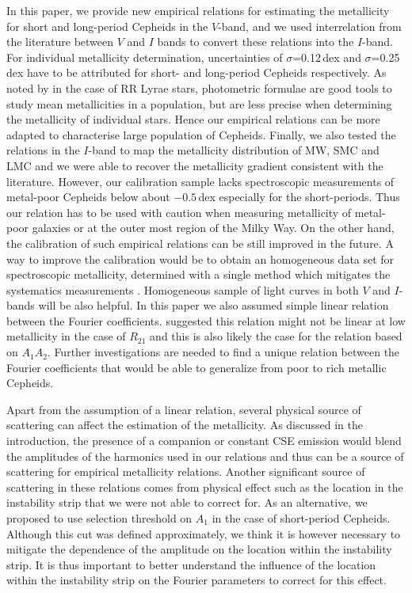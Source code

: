 \documentclass[article]{aa} %
\begin{document}
In this paper, we provide new empirical relations for estimating the metallicity for short and long-period Cepheids in the $V$-band, and we used interrelation from the literature between $V$ and $I$ bands to convert these relations into the $I$-band.
 For individual metallicity determination, uncertainties of $\sigma$=0.12$\,$dex and $\sigma$=0.25$\,$dex have to be attributed for short- and long-period Cepheids respectively. As noted by \cite{Cacciari2005} in the case of RR Lyrae stars, photometric formulae are good tools to study mean metallicities in a population, but are less precise when determining the metallicity of individual stars. Hence our empirical relations can be more adapted to characterise large population of Cepheids. Finally, we also tested the relations in the $I$-band to map the metallicity distribution of MW, SMC and LMC and we were able to recover the metallicity gradient consistent with the literature. However, our calibration sample lacks spectroscopic measurements of metal-poor Cepheids below about $-0.5\,$dex especially for the short-periods. Thus our relation has to be used with caution when measuring metallicity of metal-poor galaxies or at the outer most region of the Milky Way. On the other hand, the calibration of such empirical relations can be still improved in the future. A way to improve the calibration would be to obtain an homogeneous data set for spectroscopic metallicity, determined with a single method which mitigates the systematics measurements \citep{daSilva2022}. Homogeneous sample of light curves in both $V$ and $I$-bands will be also helpful. In this paper we also assumed simple linear relation between the Fourier coefficients. \cite{Klagyivik2013} suggested this relation might not be linear at low metallicity in the case of $R_{21}$ and this is also likely the case for the relation based on $A_1A_2$. Further investigations are needed to find a unique relation between the Fourier coefficients that would be able to generalize from poor to rich metallic Cepheids.
 
 Apart from the assumption of a linear relation, several physical source of scattering can affect the estimation of the metallicity. As discussed in the introduction, the presence of a companion or constant CSE emission would blend the amplitudes of the harmonics used in our relations and thus can be a source of scattering for empirical metallicity relations.
 Another significant source of scattering in these relations comes from physical effect such as the location in the instability strip that we were not able to correct for. As an alternative, we proposed to use selection threshold on $A_1$ in the case of short-period Cepheids. Although this cut was defined approximately, we think it is however necessary to mitigate the dependence of the amplitude on the location within the instability strip. It is thus important to better understand the influence of the location within the instability strip on the Fourier parameters to correct for this effect.
 
\end{document}

